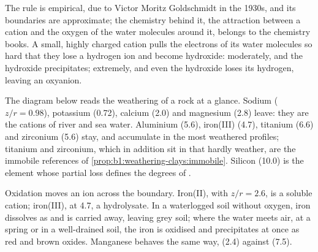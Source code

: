 The rule is empirical, due to Victor Moritz Goldschmidt in the 1930s, and its
boundaries are approximate; the chemistry behind it, the attraction between a
cation and the oxygen of the water molecules around it, belongs to the
chemistry books. A small, highly charged cation pulls the electrons of its
water molecules so hard that they lose a hydrogen ion and become hydroxide:
moderately, and the hydroxide precipitates; extremely, and even the hydroxide
loses its hydrogen, leaving an oxyanion.

The diagram below reads the weathering of a rock at a glance. Sodium ($z/r = 0.98$),
potassium (0.72), calcium (2.0) and magnesium (2.8) leave: they are the
cations of river and sea water. Aluminium (5.6), iron(III) (4.7), titanium
(6.6) and zirconium (5.6) stay, and accumulate in the most weathered profiles;
titanium and zirconium, which in addition sit in  that hardly weather,
are the immobile references of \cref{prop:b1:weathering-clays:immobile}. Silicon
(10.0) is the element whose partial loss defines the degrees of .

Oxidation moves an ion across the boundary. Iron(II), with $z/r = 2.6$, is a
soluble cation; iron(III), at 4.7, a hydrolysate. In a waterlogged soil
without oxygen, iron dissolves as  and is carried away, leaving grey
soil; where the water meets air, at a spring or in a well-drained soil, the
iron is oxidised and precipitates at once as red and brown oxides. Manganese
behaves the same way,  (2.4) against  (7.5).

